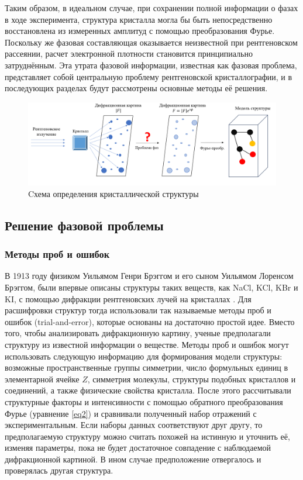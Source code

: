 Таким образом, в идеальном случае, при сохранении полной информации о фазах в ходе эксперимента, структура кристалла могла бы быть непосредственно восстановлена из измеренных амплитуд с помощью преобразования Фурье. Поскольку же фазовая составляющая оказывается неизвестной при рентгеновском рассеянии, расчет электронной плотности становится принципиально затруднённым. Эта утрата фазовой информации, известная как фазовая проблема, представляет собой центральную проблему рентгеновской кристаллографии, и в последующих разделах будут рассмотрены основные методы её решения.


\begin{figure}[H]
	\centering
	\includegraphics[width=1.0\textwidth]{figures/determination.png}\hfill
	\caption{Cхема определения кристаллической структуры}
	\label{determination}
\end{figure}


\subsection{Решение фазовой проблемы}

\subsubsection{Методы проб и ошибок}

В 1913 году физиком Уильямом Генри Брэггом и его сыном Уильямом Лоренсом Брэггом, были впервые описаны структуры таких веществ, как NaCl, KCl, KBr и KI, с помощью дифракции рентгеновских лучей на кристаллах \cite{hauptman_phase_1951}. Для расшифровки структур тогда использовали так называемые методы проб и ошибок (trial-and-error), которые основаны на достаточно простой идее. Вместо того, чтобы анализировать дифракционную картину, ученые предполагали структуру из известной информации о веществе. Методы проб и ошибок могут использовать следующую информацию для формирования модели структуры: возможные пространственные группы симметрии, число формульных единиц в элементарной ячейке $Z$, симметрия молекулы, структуры подобных кристаллов и соединений, а также физические свойства кристалла. После этого рассчитывали структурные факторы и интенсивности с помощью обратного преобразования Фурье (уравнение \ref{eq2}) и сравнивали полученный набор отражений с экспериментальным. Если наборы данных соответствуют друг другу, то предполагаемую структуру можно считать похожей на истинную и уточнить её, изменяя параметры, пока не будет достаточное совпадение с наблюдаемой дифракционной картиной. В ином случае предположение отвергалось и проверялась другая структура.

